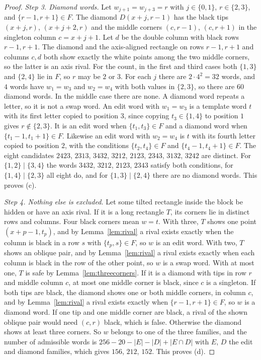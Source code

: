 \begin{proof}
\emph{Step 3. Diamond words.} Let $w_{j+1}=w_{j+3}=r$ with $j\in\{0,1\}$, $r\in\{2,3\}$, and $\{r-1,r+1\}\in F$. The diamond $D(x+j,r-1)$ has the black tips $(x+j,r)$, $(x+j+2,r)$ and the middle corners $(c,r-1)$, $(c,r+1)$ in the singleton column $c=x+j+1$. Let $d$ be the double column with black rows $r-1,r+1$. The diamond and the axis-aligned rectangle on rows $r-1,r+1$ and columns $c,d$ both show exactly the white points among the two middle corners, so the latter is an axis rival. For the count, in the first and third cases both $\{1,3\}$ and $\{2,4\}$ lie in $F$, so $r$ may be $2$ or $3$. For each $j$ there are $2\cdot4^2=32$ words, and $4$ words have $w_1=w_3$ and $w_2=w_4$ with both values in $\{2,3\}$, so there are $60$ diamond words. In the middle case there are none. A diamond word repeats a letter, so it is not a swap word. An edit word with $w_1=w_3$ is a template word $t$ with its first letter copied to position $3$, since copying $t_3\in\{1,4\}$ to position $1$ gives $r\notin\{2,3\}$. It is an edit word when $\{t_1,t_3\}\in F$ and a diamond word when $\{t_1-1,t_1+1\}\in F$. Likewise an edit word with $w_2=w_4$ is $t$ with its fourth letter copied to position $2$, with the conditions $\{t_2,t_4\}\in F$ and $\{t_4-1,t_4+1\}\in F$. The eight candidates $2423$, $2313$, $3432$, $3212$, $2123$, $2343$, $3132$, $3242$ are distinct. For $\{1,2\}\mid\{3,4\}$ the words $3432$, $3212$, $2123$, $2343$ satisfy both conditions, for $\{1,4\}\mid\{2,3\}$ all eight do, and for $\{1,3\}\mid\{2,4\}$ there are no diamond words. This proves (c).

\emph{Step 4. Nothing else is excluded.} Let some tilted rectangle inside the block be hidden or have an axis rival. If it is a long rectangle $T$, its corners lie in distinct rows and columns. Four black corners mean $w=t$. With three, $T$ shows one point $(x+p-1,t_p)$, and by Lemma~\ref{lem:rival} a rival exists exactly when the column is black in a row $s$ with $\{t_p,s\}\in F$, so $w$ is an edit word. With two, $T$ shows an oblique pair, and by Lemma~\ref{lem:rival} a rival exists exactly when each column is black in the row of the other point, so $w$ is a swap word. With at most one, $T$ is safe by Lemma~\ref{lem:threecorners}. If it is a diamond with tips in row $r$ and middle column $c$, at most one middle corner is black, since $c$ is a singleton. If both tips are black, the diamond shows one or both middle corners, in column $c$, and by Lemma~\ref{lem:rival} a rival exists exactly when $\{r-1,r+1\}\in F$, so $w$ is a diamond word. If one tip and one middle corner are black, a rival of the shown oblique pair would need $(c,r)$ black, which is false. Otherwise the diamond shows at least three corners. So $w$ belongs to one of the three families, and the number of admissible words is $256-20-|E|-|D|+|E\cap D|$ with $E$, $D$ the edit and diamond families, which gives $156$, $212$, $152$. This proves (d).
\end{proof}

